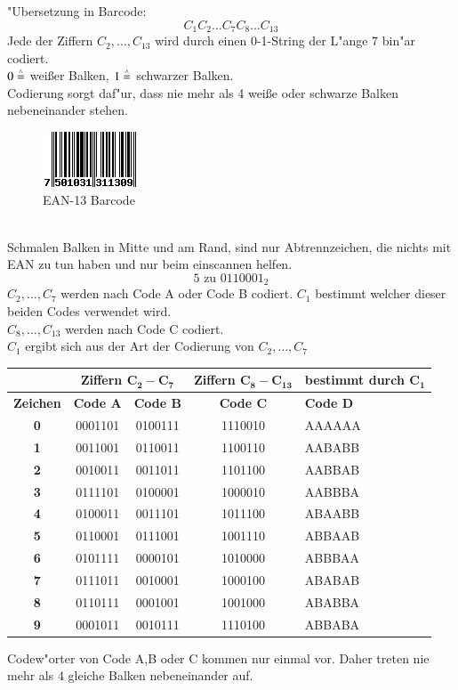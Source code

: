 \begin{enumerate}
		"Ubersetzung in Barcode:
		\[	
			C_1 C_2 \ldots C_7 C_8 \ldots C_{13}
		\]
		Jede der Ziffern $C_2, \ldots, C_{13}$ wird durch einen 0-1-String der L"ange 7 bin"ar codiert. \\
		$0 \stackrel{\scriptscriptstyle\wedge}{=}$ wei\ss er Balken, $1 \stackrel{\scriptscriptstyle\wedge}{=}$ schwarzer Balken. \\
		Codierung sorgt daf"ur, dass nie mehr als 4 wei\ss e oder schwarze Balken nebeneinander stehen. \\
		\begin{figure}[h]
			\centering
			\includegraphics{./img/ean13.png}
			\caption{EAN-13 Barcode}
			\label{img:EAN-13 Barcode}
		\end{figure}
		\\
		Schmalen Balken in Mitte und am Rand, sind nur Abtrennzeichen, die nichts mit EAN zu tun haben und nur beim einscannen helfen.\\
		\[
			5 \text{ zu }0110001_2
		\]
		$C_2,\ldots, C_7$ werden nach Code A oder Code B codiert. $C_1$ bestimmt welcher dieser beiden Codes verwendet wird. \\
		$C_8,\ldots, C_{13}$ werden nach Code C codiert.\\
		$C_1$ ergibt sich aus der Art der Codierung von $C_2,\ldots,C_7$

		\begin{center}
			\begin{tabular}{| c | c | c | c | p{2cm} |}
			\hline
			 &\multicolumn{2}{|c|}{\textbf{Ziffern $\mathbf{C_2 - C_7}$}} & \textbf{Ziffern $\mathbf{C_8 - C_{13}}$} & \textbf{bestimmt durch} $\mathbf{C_1}$ \\
			\hline
			\textbf{Zeichen} & \textbf{Code A} & \textbf{Code B} & \textbf{Code C} & \textbf{Code D}\\
			\hline
			\textbf{0} &	0001101 &	0100111 &	1110010 &	AAAAAA\\
			\textbf{1} &	0011001 &	0110011 &	1100110 &	AABABB\\
			\textbf{2} &	0010011 &	0011011 &	1101100 &	AABBAB\\
			\textbf{3} &	0111101 &	0100001 &	1000010 &	AABBBA\\
			\textbf{4} &	0100011 &	0011101 &	1011100 &	ABAABB\\
			\textbf{5} &	0110001 &	0111001 &	1001110 &	ABBAAB\\
			\textbf{6} &	0101111 &	0000101 &	1010000 &	ABBBAA\\
			\textbf{7} &	0111011 &	0010001 &	1000100 & 	ABABAB\\
			\textbf{8} &	0110111 &	0001001 &	1001000 &	ABABBA\\
			\textbf{9} &	0001011 &	0010111 &	1110100 &	ABBABA\\
			\hline
			\end{tabular}
		\end{center}
		Codew"orter von Code A,B oder C kommen nur einmal vor. Daher treten nie mehr als 4 gleiche Balken nebeneinander auf. \\
\end{enumerate}

